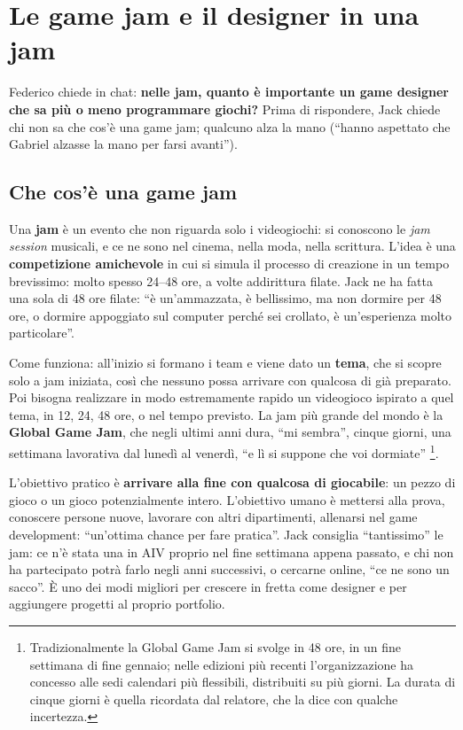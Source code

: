 \section{Le game jam e il designer in una jam}
\label{p2:sec:jam}

Federico chiede in chat: \textbf{nelle jam, quanto è importante un game
designer che sa più o meno programmare giochi?} Prima di rispondere, Jack
chiede chi non sa che cos'è una game jam; qualcuno alza la mano (``hanno
aspettato che Gabriel alzasse la mano per farsi avanti'').

\subsection{Che cos'è una game jam}

Una \textbf{jam} è un evento che non riguarda solo i videogiochi: si
conoscono le \emph{jam session} musicali, e ce ne sono nel cinema, nella
moda, nella scrittura. L'idea è una \textbf{competizione amichevole} in cui
si simula il processo di creazione in un tempo brevissimo: molto spesso
24--48 ore, a volte addirittura filate. Jack ne ha fatta una sola di 48 ore
filate: ``è un'ammazzata, è bellissimo, ma non dormire per 48 ore, o dormire
appoggiato sul computer perché sei crollato, è un'esperienza molto
particolare''.

Come funziona: all'inizio si formano i team e viene dato un \textbf{tema},
che si scopre solo a jam iniziata, così che nessuno possa arrivare con
qualcosa di già preparato. Poi bisogna realizzare in modo estremamente
rapido un videogioco ispirato a quel tema, in 12, 24, 48 ore, o nel tempo
previsto. La jam più grande del mondo è la \textbf{Global Game Jam}, che
negli ultimi anni dura, ``mi sembra'', cinque giorni, una settimana
lavorativa dal lunedì al venerdì, ``e lì si suppone che voi dormiate''
\footnote{Tradizionalmente la Global Game Jam si svolge in 48 ore, in un fine
settimana di fine gennaio; nelle edizioni più recenti l'organizzazione ha
concesso alle sedi calendari più flessibili, distribuiti su più giorni. La
durata di cinque giorni è quella ricordata dal relatore, che la dice con
qualche incertezza.}.

L'obiettivo pratico è \textbf{arrivare alla fine con qualcosa di
giocabile}: un pezzo di gioco o un gioco potenzialmente intero. L'obiettivo
umano è mettersi alla prova, conoscere persone nuove, lavorare con altri
dipartimenti, allenarsi nel game development: ``un'ottima chance per fare
pratica''. Jack consiglia ``tantissimo'' le jam: ce n'è stata una in AIV
proprio nel fine settimana appena passato, e chi non ha partecipato potrà
farlo negli anni successivi, o cercarne online, ``ce ne sono un sacco''. È
uno dei modi migliori per crescere in fretta come designer e per aggiungere
progetti al proprio portfolio.

